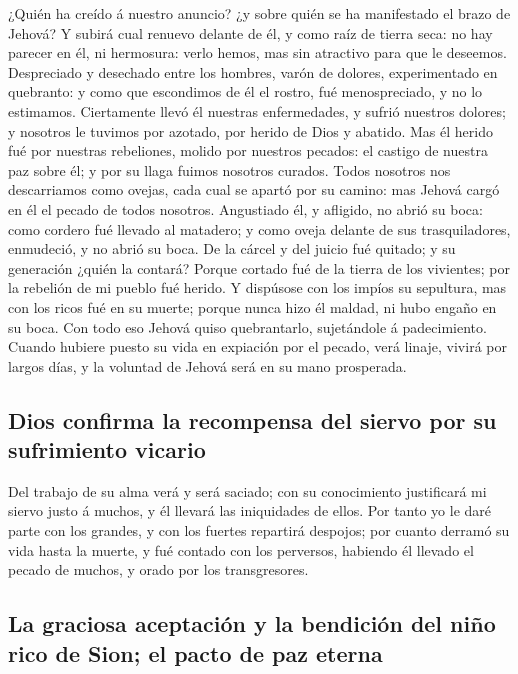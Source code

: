  ¿Quién ha creído á nuestro anuncio? ¿y sobre quién se ha
manifestado el brazo de Jehová?  Y subirá cual renuevo
delante de él, y como raíz de tierra seca: no hay parecer en él, ni
hermosura: verlo hemos, mas sin atractivo para que le deseemos.
 Despreciado y desechado entre los hombres, varón de
dolores, experimentado en quebranto: y como que escondimos de él el
rostro, fué menospreciado, y no lo estimamos.  Ciertamente
llevó él nuestras enfermedades, y sufrió nuestros dolores; y nosotros le
tuvimos por azotado, por herido de Dios y abatido.  Mas él
herido fué por nuestras rebeliones, molido por nuestros pecados: el
castigo de nuestra paz sobre él; y por su llaga fuimos nosotros curados.
 Todos nosotros nos descarriamos como ovejas, cada cual se
apartó por su camino: mas Jehová cargó en él el pecado de todos
nosotros.  Angustiado él, y afligido, no abrió su boca: como
cordero fué llevado al matadero; y como oveja delante de sus
trasquiladores, enmudeció, y no abrió su boca.  De la cárcel
y del juicio fué quitado; y su generación ¿quién la contará? Porque
cortado fué de la tierra de los vivientes; por la rebelión de mi pueblo
fué herido.  Y dispúsose con los impíos su sepultura, mas
con los ricos fué en su muerte; porque nunca hizo él maldad, ni hubo
engaño en su boca.  Con todo eso Jehová quiso quebrantarlo,
sujetándole á padecimiento. Cuando hubiere puesto su vida en expiación
por el pecado, verá linaje, vivirá por largos días, y la voluntad de
Jehová será en su mano prosperada.

\hypertarget{dios-confirma-la-recompensa-del-siervo-por-su-sufrimiento-vicario}{%
\subsection{Dios confirma la recompensa del siervo por su sufrimiento
vicario}\label{dios-confirma-la-recompensa-del-siervo-por-su-sufrimiento-vicario}}

 Del trabajo de su alma verá y será saciado; con su
conocimiento justificará mi siervo justo á muchos, y él llevará las
iniquidades de ellos.  Por tanto yo le daré parte con los
grandes, y con los fuertes repartirá despojos; por cuanto derramó su
vida hasta la muerte, y fué contado con los perversos, habiendo él
llevado el pecado de muchos, y orado por los transgresores.

\hypertarget{la-graciosa-aceptaciuxf3n-y-la-bendiciuxf3n-del-niuxf1o-rico-de-sion-el-pacto-de-paz-eterna}{%
\subsection{La graciosa aceptación y la bendición del niño rico de Sion;
el pacto de paz
eterna}\label{la-graciosa-aceptaciuxf3n-y-la-bendiciuxf3n-del-niuxf1o-rico-de-sion-el-pacto-de-paz-eterna}}


